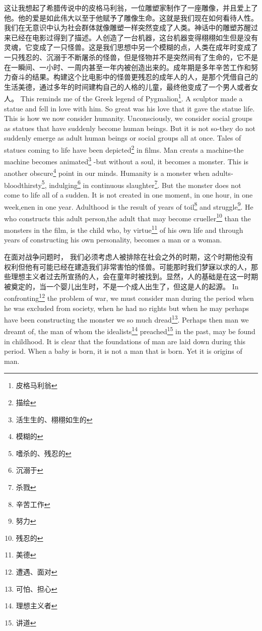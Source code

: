 \documentclass[lang=cn,10pt]{elegantbook}
\begin{document}
\begin{tcolorbox}[title=译文,
colback=red!5!white,
colframe=red!75!black,
fonttitle=\bfseries]
这让我想起了希腊传说中的皮格马利翁，一位雕塑家制作了一座雕像，并且爱上了他。他的爱是如此伟大以至于他赋予了雕像生命。这就是我们现在如何看待人性。我们在无意识中认为社会群体就像雕塑一样突然变成了人类。神话中的雕塑苏醒过来已经在电影过得到了描述。人创造了一台机器，这台机器变得栩栩如生但是没有灵魂，它变成了一只怪兽。这是我们思想中另一个模糊的点，人类在成年时变成了一只残忍的、沉溺于不断屠杀的怪兽，但是怪物并不是突然间有了生命的，它不是在一瞬间、一小时、一周内甚至一年内被创造出来的。成年期是多年辛苦工作和努力奋斗的结果。构建这个比电影中的怪兽更残忍的成年人的人，是那个凭借自己的生活美德，通过多年的时间建构自己的人格的儿童，最终他变成了一个男人或者女人。
This reminds me of the Greek legend of Pygmalion\footnote{皮格马利翁}. A sculptor made a statue and fell in love with him. So great was his love that it gave the statue life. This is how we now consider humanity. Unconsciously, we consider social groups as statues that have suddenly become human beings. But it is not so-they do not suddenly emerge as adult human beings or social groups all at once. Tales of statues coming to life have been depicted\footnote{描绘} in films. Man creats a machine-the machine becomes animated\footnote{活生生的、栩栩如生的} -but without a soul, it becomes a monster. This is another obscure\footnote{模糊的} point in our minds. Humanity is a monster when adults-bloodthirsty\footnote{嗜杀的、残忍的}, indulging\footnote{沉溺于} in continuous slaughter\footnote{杀戮}. But the monster does not come to life all of a sudden. It is not created in one moment, in one hour, in one week,enen in one year. Adulthood is the result of years of toil\footnote{辛苦工作} and struggle\footnote{努力}. He who constructs this adult person,the adult that may become crueller\footnote{残忍的} than the monsters in the film, is the child who, by virtue\footnote{美德} of his own life and through years of constructing his own personality, becomes a man or a woman.
\end{tcolorbox}

\begin{tcolorbox}[title=译文,
colback=red!5!white,
colframe=red!75!black,
fonttitle=\bfseries]
在面对战争问题时， 我们必须考虑人被排除在社会之外的时期，这个时期他没有权利但他有可能已经在建造我们非常害怕的怪兽。可能那时我们梦寐以求的人，那些理想主义者过去所宣扬的人，会在童年时被找到。显然，人的基础是在这一时期被奠定的，当一个婴儿出生时，不是一个成人出生了，但这是人的起源。
In confronting\footnote{遭遇、面对} the problem of war, we must consider man during the period when he was excluded from society, when he had no rights but when he may perhaps have been constructing the monster we so much dread\footnote{可怕、担心}. Perhaps then man we dreamt of, the man of whom the idealists\footnote{理想主义者} preached\footnote{讲道} in the past, may be found in childhood. It is clear that the foundations of man are laid down during this period. When a baby is born, it is not a man that is born. Yet it is origins of man.
\end{tcolorbox}
\end{document}
